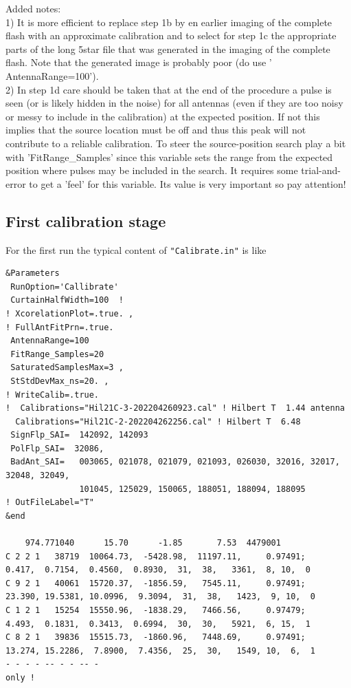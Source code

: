 Added notes:
\\1) It is more efficient to replace step 1b by en earlier imaging of the complete flash with an approximate calibration and to select for step 1c the appropriate parts of the long 5star file that was generated in the imaging of the complete flash. Note that the generated image is probably poor (do use ' AntennaRange=100').
\\2) In step 1d care should be taken that at the end of the procedure a pulse is seen (or is likely hidden in the noise) for all antennas (even if they are too noisy or messy to include in the calibration) at the expected position. If not this implies that the source location must be off and thus this peak will not contribute to a reliable calibration. To steer the source-position search play a bit with 'FitRange\_Samples' since this variable sets the range from the expected position where pulses may be included in the search. It requires some trial-and-error to get a 'feel' for this variable. Its value is very important so pay attention!


\subsection{First calibration stage}

For the first run the typical content of \verb!"Calibrate.in"! is like

\begin{linenumbers}
\tiny
\resetlinenumber
\begin{verbatim}
&Parameters
 RunOption='Callibrate'
 CurtainHalfWidth=100  !
! XcorelationPlot=.true. ,
! FullAntFitPrn=.true.
 AntennaRange=100
 FitRange_Samples=20
 SaturatedSamplesMax=3 ,
 StStdDevMax_ns=20. ,
! WriteCalib=.true.
!  Calibrations="Hil21C-3-202204260923.cal" ! Hilbert T  1.44 antenna
  Calibrations="Hil21C-2-202204262256.cal" ! Hilbert T  6.48
 SignFlp_SAI=  142092, 142093
 PolFlp_SAI=  32086,
 BadAnt_SAI=   003065, 021078, 021079, 021093, 026030, 32016, 32017, 32048, 32049,
               101045, 125029, 150065, 188051, 188094, 188095
! OutFileLabel="T"
&end

    974.771040      15.70      -1.85       7.53  4479001
C 2 2 1   38719  10064.73,  -5428.98,  11197.11,     0.97491;    0.417,  0.7154,  0.4560,  0.8930,  31,  38,   3361,  8, 10,  0
C 9 2 1   40061  15720.37,  -1856.59,   7545.11,     0.97491;   23.390, 19.5381, 10.0996,  9.3094,  31,  38,   1423,  9, 10,  0
C 1 2 1   15254  15550.96,  -1838.29,   7466.56,     0.97479;    4.493,  0.1831,  0.3413,  0.6994,  30,  30,   5921,  6, 15,  1
C 8 2 1   39836  15515.73,  -1860.96,   7448.69,     0.97491;   13.274, 15.2286,  7.8900,  7.4356,  25,  30,   1549, 10,  6,  1
- - - - -- - - -- -
only !
\end{verbatim}
\end{linenumbers}

